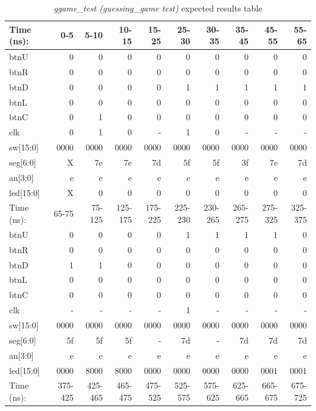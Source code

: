 \documentclass[11pt]{article}
\begin{document}
\begin{table}[ht]\centering
	\caption{\textit{ggame\_test (guessing\_game test)} expected results table}
	\label{ALU:tbl:alu_ERT}\medskip
	\begin{tabular}{l|rrrrrrrrr}
		Time (ns): & 0-5 & 5-10 & 10-15 & 15-25 & 25-30 & 30-35 & 35-45 & 45-55 & 55-65  \\
		\midrule
		btnU & 0  & 0 & 0 & 0 & 0 & 0 & 0 & 0 & 0   \\
		btnR & 0  & 0 & 0 & 0 & 0 & 0 & 0 & 0 & 0 \\
		btnD & 0  & 0 & 0 & 0 & 1 & 1 & 1 & 1 & 1   \\
		btnL & 0  & 0 & 0 & 0 & 0 & 0 & 0 & 0 & 0  \\
		btnC & 0  & 1 & 0 & 0 & 0 & 0 & 0 & 0 & 0  \\
		clk & 0  & 1 & 0 & - & 1 & 0 & - &- & -   \\
		sw[15:0] & 0000 & 0000 &0000 & 0000 & 0000 & 0000 & 0000 & 0000 & 0000   \\
		\midrule
		seg[6:0] & X & 7e & 7e & 7d  & 5f & 5f & 3f & 7e & 7d \\
		an[3:0] & e & e & e & e & e & e & e & e & e \\
		led[15:0] & X & 0 & 0 & 0 & 0 & 0 & 0 & 0 & 0 \\
		\midrule
		Time (ns): & 65-75 & 75-125 & 125-175 & 175-225 & 225-230 & 230-265 & 265-275 & 275-325 & 325-375  \\
		\midrule
		btnU & 0  & 0 & 0 & 0 & 1 & 1 & 1 & 1 & 0   \\
		btnR & 0  & 0 & 0 & 0 & 0 & 0 & 0 & 0 & 0 \\
		btnD & 1  & 1 & 0 & 0 & 0 & 0 & 0 & 0 & 0   \\
		btnL & 0  & 0 & 0 & 0 & 0 & 0 & 0 & 0 & 0  \\
		btnC & 0  & 0 & 0 & 0 & 0 & 0 & 0 & 0 & 0  \\
		clk & - & - & -& - & 1 & - & - & - & -   \\
		sw[15:0] &0000 & 0000 & 0000 &0000 & 0000 & 0000 & 0000 & 0000 & 0000   \\
		\midrule
		seg[6:0] & 5f & 5f & 5f & -  & 7d & - & 7d & 7d & 7d  \\
		an[3:0] & e & e & e & e & e & e & e & e & e \\
		led[15:0] & 0000 & 8000 & 8000 & 0000 & 0000 & 0000 & 0000 & 0001 & 0001 \\
		\midrule
		Time (ns): & 375-425 & 425-465 & 465-475 & 475-525 & 525-575 & 575-625 & 625-665 & 665-675 & 675-725  \\

\end{tabular}
\end{table}
\end{document}
